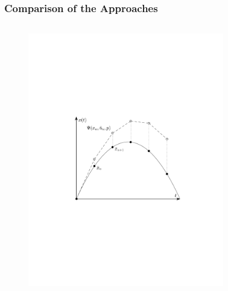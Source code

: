 \begin{frame}
    \frametitle{Comparison of the Approaches}

    \begin{columns}[t]
            \begin{figure}
                \centering
                \includegraphics[trim=3cm 7cm 3cm 9cm, clip=true, width=\linewidth]{img/contExplEulerPlot}
            \end{figure}
            \begin{figure}
                \centering

\end{figure}
\end{columns}
\end{frame}
